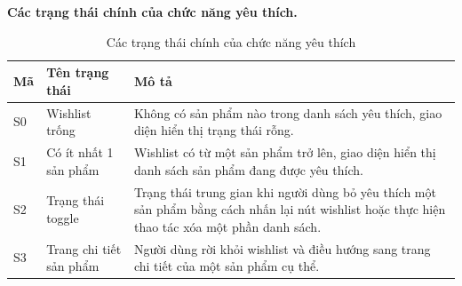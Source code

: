 \textbf{Các trạng thái chính của chức năng yêu thích.}
\begin{table}[H]
	\centering
	\small
	\renewcommand{\arraystretch}{1.25}
	\begin{tabularx}{\textwidth}{|>{\centering\arraybackslash}p{1.5cm}|>{\raggedright\arraybackslash}p{4.0cm}|>{\raggedright\arraybackslash}X|}
		\hline
		\textbf{Mã} & \textbf{Tên trạng thái} & \textbf{Mô tả}                                                                                                                                 \\
		\hline
		S0          & Wishlist trống          & Không có sản phẩm nào trong danh sách yêu thích, giao diện hiển thị trạng thái rỗng.                                                           \\
		\hline
		S1          & Có ít nhất 1 sản phẩm   & Wishlist có từ một sản phẩm trở lên, giao diện hiển thị danh sách sản phẩm đang được yêu thích.                                                \\
		\hline
		S2          & Trạng thái toggle       & Trạng thái trung gian khi người dùng bỏ yêu thích một sản phẩm bằng cách nhấn lại nút wishlist hoặc thực hiện thao tác xóa một phần danh sách. \\
		\hline
		S3          & Trang chi tiết sản phẩm & Người dùng rời khỏi wishlist và điều hướng sang trang chi tiết của một sản phẩm cụ thể.                                                        \\
		\hline
	\end{tabularx}
	\caption{Các trạng thái chính của chức năng yêu thích}
	\label{tab:wishlist-states}
\end{table}

